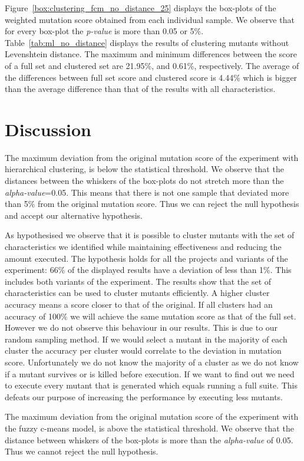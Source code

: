 \documentclass[conference,draftclsnofoot,onecolumn]{IEEEtran}
\begin{document}
Figure~\ref{box:clustering_fcm_no_distance_25} displays the box-plots of the weighted mutation score obtained from each individual sample. 
We observe that for every box-plot the \textit{p-value} is more than 0.05 or 5\%.
Table~\ref{tab:ml_no_distance} displays the results of clustering mutants without Levenshtein distance.
The maximum and minimum differences between the score of a full set and clustered set are 21.95\%, and 0.61\%, respectively.
The average of the differences between full set score and clustered score is 4.44\% which is bigger than the average difference than that of the results with all characteristics.

\section{Discussion}
The maximum deviation from the original mutation score of the experiment with hierarchical clustering, is below the statistical threshold.
We observe that the distances between the whiskers of the box-plots do not stretch more than the \textit{alpha-value}=0.05.
This means that there is not one sample that deviated more than 5\% from the original mutation score.
Thus we can reject the null hypothesis and accept our alternative hypothesis.

As hypothesised we observe that it is possible to cluster mutants with the set of characteristics we identified while maintaining effectiveness and reducing the amount executed. The hypothesis holds for all the projects and variants of the experiment: 66\% of the displayed results have a deviation of less than 1\%. 
This includes both variants of the experiment.
The results show that the set of characteristics can be used to cluster mutants efficiently.
A higher cluster accuracy means a score closer to that of the original.
If all clusters had an accuracy of 100\% we will achieve the same mutation score as that of the full set.
However we do not observe this behaviour in our results.
This is due to our random sampling method.
If we would select a mutant in the majority of each cluster the accuracy per cluster would correlate to the deviation in mutation score.
Unfortunately we do not know the majority of a cluster as we do not know if a mutant survives or is killed before execution.
If we want to find out we need to execute every mutant that is generated which equals running a full suite.
This defeats our purpose of increasing the performance by executing less mutants.

The maximum deviation from the original mutation score of the experiment with the fuzzy c-means model, is above the statistical threshold.
We observe that the distance between whiskers of the box-plots is more than the \textit{alpha-value} of 0.05.
Thus we cannot reject the null hypothesis.
\end{document}
